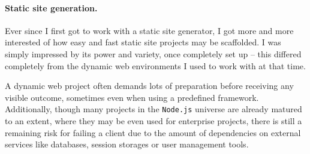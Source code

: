 \paragraph{Static site generation.}
Ever since I first got to work with a static site generator, I got more and more interested of how easy and fast static site projects may be scaffolded. I was simply impressed by its power and variety, once completely set up -- this differed completely from the dynamic web environments I used to work with at that time.

A dynamic web project often demands lots of preparation before receiving any visible outcome, sometimes even when using a predefined framework. Additionally, though many projects in the \texttt{Node.js} universe are already matured to an extent, where they may be even used for enterprise projects, there is still a remaining risk for failing a client due to the amount of dependencies on external services like databases, session storages or user management tools.




